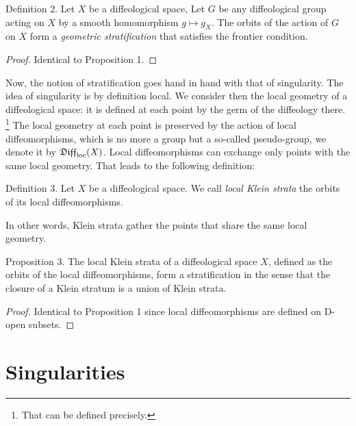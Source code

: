\begin{Article}{Definition 2.}{}
  Let $X$ be a diffeological space,
  Let $G$ be any diffeological group acting on $X$ by a smooth homomorphism $g \mapsto g_X$.
  The orbits of the action of $G$ on $X$ form a \emph{geometric stratification} that satisfies the frontier condition.
\end{Article}

\begin{proof}
  Identical to Proposition 1.
\end{proof}

Now,
the notion of stratification goes hand in hand with that of singularity.
The idea of singularity is by definition local.
We consider then the local geometry of a diffeological space:
it is defined at each point by the germ of the diffeology there.%
\footnote{That can be defined precisely.}
The local geometry at each point is preserved by the action of local diffeomorphisms,
which is no more a group but a so-called pseudo-group,
we denote it by $\mathfrak{Diff}_{\mathrm{loc}}(X)$.
Local diffeomorphisms can exchange only points with the same local geometry.
That leads to the following definition:

\begin{Article}{Definition 3.}{}
  Let $X$ be a diffeological space.
  We call \emph{local Klein strata} the orbits of its local diffeomorphisms.
\end{Article}

In other words,
Klein strata gather the points that share the same local geometry.

\begin{Article}{Proposition 3.}{}
  The local Klein strata of a diffeological space $X$,
  defined as the orbits of the local diffeomorphisms,
  form a stratification in the sense that the closure of a Klein stratum is a union of Klein strata.
\end{Article}

\begin{proof}
  Identical to Proposition 1 since local diffeomorphisms are defined on D-open subsets.
\end{proof}

\section{Singularities}

